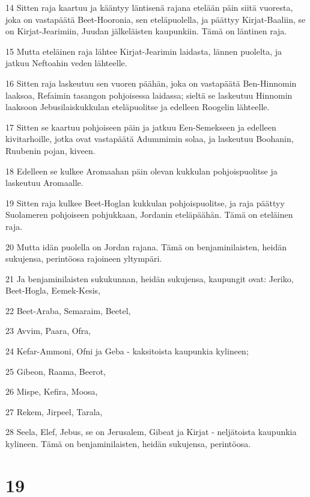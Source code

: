 \par 14 Sitten raja kaartuu ja kääntyy läntisenä rajana etelään päin siitä vuoresta, joka on vastapäätä Beet-Hooronia, sen eteläpuolella, ja päättyy Kirjat-Baaliin, se on Kirjat-Jearimiin, Juudan jälkeläisten kaupunkiin. Tämä on läntinen raja.
\par 15 Mutta eteläinen raja lähtee Kirjat-Jearimin laidasta, lännen puolelta, ja jatkuu Neftoahin veden lähteelle.
\par 16 Sitten raja laskeutuu sen vuoren päähän, joka on vastapäätä Ben-Hinnomin laaksoa, Refaimin tasangon pohjoisessa laidassa; sieltä se laskeutuu Hinnomin laaksoon Jebusilaiskukkulan eteläpuolitse ja edelleen Roogelin lähteelle.
\par 17 Sitten se kaartuu pohjoiseen päin ja jatkuu Een-Semekseen ja edelleen kivitarhoille, jotka ovat vastapäätä Adummimin solaa, ja laskeutuu Boohanin, Ruubenin pojan, kiveen.
\par 18 Edelleen se kulkee Aromaahan päin olevan kukkulan pohjoispuolitse ja laskeutuu Aromaalle.
\par 19 Sitten raja kulkee Beet-Hoglan kukkulan pohjoispuolitse, ja raja päättyy Suolameren pohjoiseen pohjukkaan, Jordanin eteläpäähän. Tämä on eteläinen raja.
\par 20 Mutta idän puolella on Jordan rajana. Tämä on benjaminilaisten, heidän sukujensa, perintöosa rajoineen yltympäri.
\par 21 Ja benjaminilaisten sukukunnan, heidän sukujensa, kaupungit ovat: Jeriko, Beet-Hogla, Eemek-Kesis,
\par 22 Beet-Araba, Semaraim, Beetel,
\par 23 Avvim, Paara, Ofra,
\par 24 Kefar-Ammoni, Ofni ja Geba - kaksitoista kaupunkia kylineen;
\par 25 Gibeon, Raama, Beerot,
\par 26 Mispe, Kefira, Moosa,
\par 27 Rekem, Jirpeel, Tarala,
\par 28 Seela, Elef, Jebus, se on Jerusalem, Gibeat ja Kirjat - neljätoista kaupunkia kylineen. Tämä on benjaminilaisten, heidän sukujensa, perintöosa.

\chapter{19}

